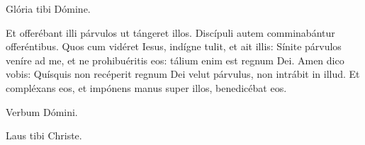 \rubricatum{\Rbardot{}} Glória tibi Dómine.

Et offerébant illi párvulos ut tángeret illos. Discípuli autem comminabántur offeréntibus.
Quos cum vidéret Iesus, indígne tulit, et ait illis:
Sínite párvulos veníre ad me, et ne prohibuéritis eos: tálium enim est regnum Dei.
Amen dico vobis: Quísquis non recéperit regnum Dei velut párvulus, non intrábit in illud.
Et compléxans eos, et impónens manus super illos, benedicébat eos.

Verbum Dómini.

\rubricatum{\Rbardot{}} Laus tibi Christe.

